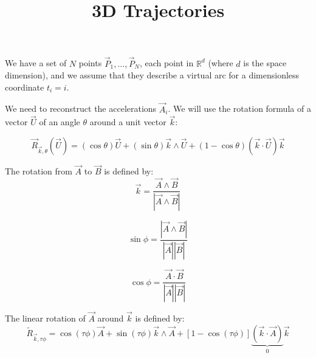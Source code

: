\documentclass[aps,12pt]{revtex4}
\begin{document}
\title{3D Trajectories}
\maketitle
	
We have a set of $N$ points $\vec{P}_1,\ldots,\vec{P}_N$, each point in $\mathbb{R}^d$ (where $d$ is the space dimension), and we assume
that they describe a virtual arc for a dimensionless coordinate $t_i=i$.

We need to reconstruct the accelerations $\vec{A}_i$.
We will use the rotation formula of a vector $\vec{U}$ of an angle $\theta$ around a unit vector $\vec{k}$:

\begin{equation}
	\vec{R}_{\vec{k},\theta}(\vec{U})=	 \left(\cos \theta\right) \vec{U}
	+ \left(\sin \theta\right) \vec{k} \wedge\vec{U} 
	+ \left(1-\cos\theta\right) \left(\vec{k}\cdot\vec{U}\right)\vec{k}
\end{equation}

The rotation from $\vec{A}$ to $\vec{B}$ is defined by:
\begin{equation}
	\vec{k} = \dfrac{\vec{A}\wedge\vec{B}}{\left|\vec{A}\wedge\vec{B} \right|}
\end{equation}

\begin{equation}
	\sin \phi =  \dfrac{\left|\vec{A}\wedge\vec{B} \right|}{\left|\vec{A}\right| \left|\vec{B}\right|}
\end{equation}

\begin{equation}
	\cos \phi = \dfrac{ \vec{A} \cdot \vec{B} }{ \left|\vec{A}\right| \left|\vec{B}\right| }
\end{equation}

The linear rotation of $\vec{A}$ around $\vec{k}$ is defined by:
\begin{equation}
 \tilde{R}_{\vec{k},\tau\phi} = \cos(\tau\phi) \vec{A} + \sin(\tau\phi) \vec{k} \wedge \vec{A} + \left[1-\cos(\tau\phi)\right] \underbrace{\left(\vec{k}\cdot\vec{A}\right)}_{0}\vec{k}
\end{equation}
\end{document}
